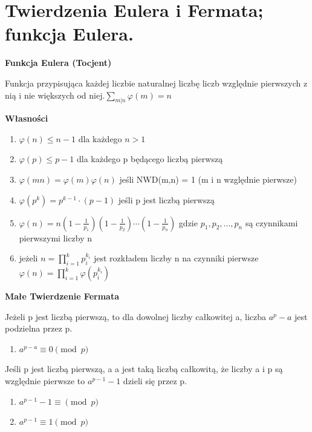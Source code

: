 \documentclass[12pt]{article}
\begin{document}
    \section{Twierdzenia Eulera i Fermata; funkcja Eulera.}
    \begin{definition}
        \textbf{Funkcja Eulera (Tocjent)}

        Funkcja przypisująca każdej liczbie naturalnej liczbę liczb względnie pierwszych z nią i nie większych od niej.\newline $\sum_{m|n}^{} \varphi(m) = n$\newline

        \textbf{Własności}
        \begin{enumerate}
            \item $\varphi (n) \leq n - 1$  dla każdego $n>1$
            \item $\varphi (p) \leq p - 1$ dla każdego p będącego liczbą pierwszą
            \item $\varphi (mn) = \varphi (m)\varphi(n)$ jeśli NWD(m,n) = 1 (m i n względnie pierwsze)
            \item $\varphi(p^{k}) = p^{k-1} \cdot (p-1)$ jeśli p jest liczbą pierwszą
            \item $\varphi(n) = n
            \left (  1 - \frac{1}{p_1}\right)
            \left (  1 - \frac{1}{p_2}\right)
            \cdots
            \left (  1 - \frac{1}{p_n}\right)$
            gdzie $p_1, p_2, ..., p_n$ są czynnikami pierwszymi liczby n
            \item jeżeli $n = \prod_{i=1}^{k} p_i^{k_i}$ jest rozkładem liczby n na czynniki pierwsze $\varphi (n) = \prod_{i=1}^{k} \varphi \left( p_i^{k_i} \right )$
        \end{enumerate}
    \end{definition}

    \begin{definition}
        \textbf{Małe Twierdzenie Fermata}

        Jeżeli p jest liczbą pierwszą, to dla dowolnej liczby całkowitej a, liczba $a^{p}-a$ jest podzielna przez p.\newline
        \begin{enumerate}
            \item $a^{p-a} \equiv 0 \pmod p$\newline
        \end{enumerate}

        Jeśli p jest liczbą pierwszą, a a jest taką liczbą całkowitą, że liczby a i p są względnie pierwsze to $a^{p-1} - 1$ dzieli się przez p.\newline

        \begin{enumerate}
            \item$a^{p-1} - 1 \equiv \pmod p$
            \item$a^{p-1} \equiv 1 \pmod p$
        \end{enumerate}

    \end{definition}
\end{document}
